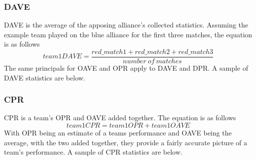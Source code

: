 \documentclass{article}
\begin{document}
\subsubsection{DAVE}
\par
DAVE is the average of the apposing alliance's collected statistics. Assuming the example team played on the blue alliance for the first three matches, the equation is as follows
$$team1DAVE = \frac{red\_match1+red\_match2+red\_match3}{number\ of\ matches}$$
The same principals for OAVE and OPR apply to DAVE and DPR. A sample of DAVE statistics are below.

\begin{table}[H]
\caption{Sample Data From DAVE Statistics Calculation}
\centering
{}
\label{table:DAVE}
\end{table}

\subsubsection{CPR}
\par
CPR is a team's OPR and OAVE added together. The equation is as follows
$$team1CPR = team1OPR+team1OAVE$$
With OPR being an estimate of a teams performance and OAVE being the average, with the two added together, they provide a fairly accurate picture of a team's performance. A sample of CPR statistics are below.

\begin{table}[H]
\caption{Sample Data From CPR Statistics Calculation}
\centering
{}
\label{table:CPR}
\end{table}
\end{document}
